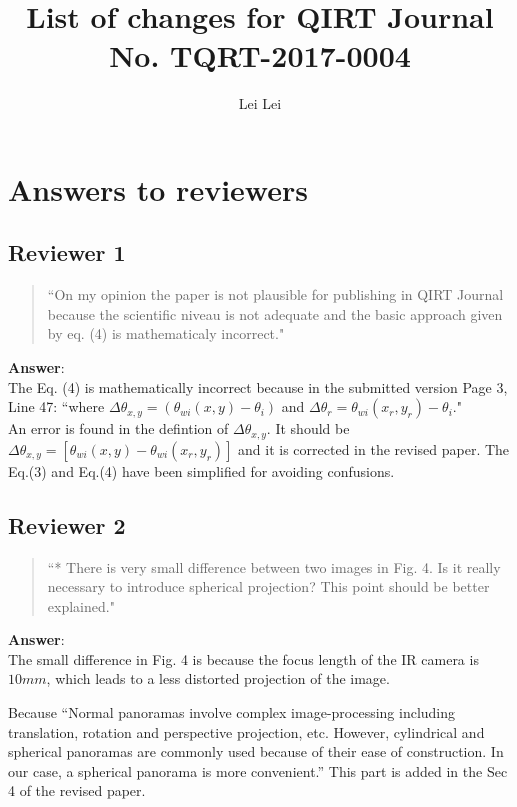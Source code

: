 \documentclass{article}
\begin{document}
    
\title{List of changes for QIRT Journal No. TQRT-2017-0004}
\author{Lei Lei}

\maketitle


\section{Answers to reviewers} %
\label{sec:answers_to_reviewers}
\subsection{Reviewer 1}

\begin{quote}
    ``On my opinion the paper is not plausible for publishing in QIRT Journal because the scientific niveau is not adequate and the basic approach given by eq. (4) is mathematicaly incorrect."
\end{quote}
\textbf{Answer}: \\
The Eq. (4) is mathematically incorrect because in the submitted version Page 3, Line 47:
``where $\Delta \theta_{x,y}=(\theta_{wi} (x,y)- \theta_{i}) $ and $ \Delta \theta_r =\theta_{wi}(x_r,y_r)- \theta_i $."\\
An error is found in the defintion of $\Delta \theta_{x,y}$. 
It should be $\Delta \theta_{x,y}=[\theta_{wi} (x,y)- \theta_{wi} (x_r,y_r)] $ and it is corrected in the revised paper. The Eq.(3) and Eq.(4) have been simplified for avoiding confusions.

\subsection{Reviewer 2}
\begin{quote}
    ``* There is very small difference between two images in Fig. 4. Is it really necessary to introduce spherical projection? This point should be better explained."
\end{quote}
\textbf{Answer}: \\
The small difference in Fig. 4 is because the focus length of the IR camera is $10 mm$, which leads to a less distorted projection of the image.

Because ``Normal panoramas involve complex image-processing including translation, rotation and perspective projection, etc. However, cylindrical and spherical panoramas are commonly used because of their ease of construction. In our case, a spherical panorama is more convenient.”
This part is added in the Sec 4 of the revised paper.
\end{document}
